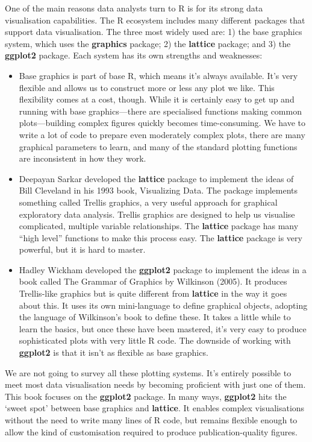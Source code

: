 \documentclass[
]{book}
\begin{document}
One of the main reasons data analysts turn to R is for its strong data visualisation capabilities. The R ecosystem includes many different packages that support data visualisation. The three most widely used are: 1) the base graphics system, which uses the \textbf{graphics} package; 2) the \textbf{lattice} package; and 3) the \textbf{ggplot2} package. Each system has its own strengths and weaknesses:

\begin{itemize}
\item
  Base graphics is part of base R, which means it's always available. It's very flexible and allows us to construct more or less any plot we like. This flexibility comes at a cost, though. While it is certainly easy to get up and running with base graphics---there are specialised functions making common plots---building complex figures quickly becomes time-consuming. We have to write a lot of code to prepare even moderately complex plots, there are many graphical parameters to learn, and many of the standard plotting functions are inconsistent in how they work.
\item
  Deepayan Sarkar developed the \textbf{lattice} package to implement the ideas of Bill Cleveland in his 1993 book, Visualizing Data. The package implements something called Trellis graphics, a very useful approach for graphical exploratory data analysis. Trellis graphics are designed to help us visualise complicated, multiple variable relationships. The \textbf{lattice} package has many ``high level'' functions to make this process easy. The \textbf{lattice} package is very powerful, but it is hard to master.
\item
  Hadley Wickham developed the \textbf{ggplot2} package to implement the ideas in a book called The Grammar of Graphics by Wilkinson (2005). It produces Trellis-like graphics but is quite different from \textbf{lattice} in the way it goes about this. It uses its own mini-language to define graphical objects, adopting the language of Wilkinson's book to define these. It takes a little while to learn the basics, but once these have been mastered, it's very easy to produce sophisticated plots with very little R code. The downside of working with \textbf{ggplot2} is that it isn't as flexible as base graphics.
\end{itemize}

We are not going to survey all these plotting systems. It's entirely possible to meet most data visualisation needs by becoming proficient with just one of them. This book focuses on the \textbf{ggplot2} package. In many ways, \textbf{ggplot2} hits the `sweet spot' between base graphics and \textbf{lattice}. It enables complex visualisations without the need to write many lines of R code, but remains flexible enough to allow the kind of customisation required to produce publication-quality figures.
\end{document}
